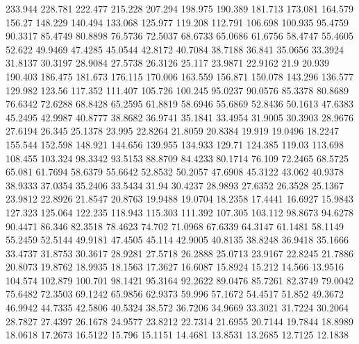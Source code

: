 233.944      228.781      222.477      215.228      207.294      198.975      190.389      181.713      173.081      164.579      156.27      148.229      140.494      133.068      125.977      119.208      112.791      106.698      100.935      95.4759      90.3317      85.4749      80.8898      76.5736      72.5037      68.6733      65.0686      61.6756      58.4747      55.4605      52.622      49.9469      47.4285      45.0544      42.8172      40.7084      38.7188      36.841      35.0656      33.3924      31.8137      30.3197      28.9084      27.5738      26.3126      25.117      23.9871      22.9162      21.9      20.939      
190.403      186.475      181.673      176.115      170.006      163.559      156.871      150.078      143.296      136.577      129.982      123.56      117.352      111.407      105.726      100.245      95.0237      90.0576      85.3378      80.8689      76.6342      72.6288      68.8428      65.2595      61.8819      58.6946      55.6869      52.8436      50.1613      47.6383      45.2495      42.9987      40.8777      38.8682      36.9741      35.1841      33.4954      31.9005      30.3903      28.9676      27.6194      26.345      25.1378      23.995      22.8264      21.8059      20.8384      19.919      19.0496      18.2247      
155.544      152.598      148.921      144.656      139.955      134.933      129.71      124.385      119.03      113.698      108.455      103.324      98.3342      93.5153      88.8709      84.4233      80.1714      76.109      72.2465      68.5725      65.081      61.7694      58.6379      55.6642      52.8532      50.2057      47.6908      45.3122      43.062      40.9378      38.9333      37.0354      35.2406      33.5434      31.94      30.4237      28.9893      27.6352      26.3528      25.1367      23.9812      22.8926      21.8547      20.8763      19.9488      19.0704      18.2358      17.4441      16.6927      15.9843      
127.323      125.064      122.235      118.943      115.303      111.392      107.305      103.112      98.8673      94.6278      90.4471      86.346      82.3518      78.4623      74.702      71.0968      67.6339      64.3147      61.1481      58.1149      55.2459      52.5144      49.9181      47.4505      45.114      42.9005      40.8135      38.8248      36.9418      35.1666      33.4737      31.8753      30.3617      28.9281      27.5718      26.2888      25.0713      23.9167      22.8245      21.7886      20.8073      19.8762      18.9935      18.1563      17.3627      16.6087      15.8924      15.212      14.566      13.9516      
104.574      102.879      100.701      98.1421      95.3164      92.2622      89.0476      85.7261      82.3749      79.0042      75.6482      72.3503      69.1242      65.9856      62.9373      59.996      57.1672      54.4517      51.852      49.3672      46.9942      44.7335      42.5806      40.5324      38.572      36.7206      34.9669      33.3021      31.7224      30.2064      28.7827      27.4397      26.1678      24.9577      23.8212      22.7314      21.6955      20.7144      19.7844      18.8989      18.0618      17.2673      16.5122      15.796      15.1151      14.4681      13.8531      13.2685      12.7125      12.1838      
